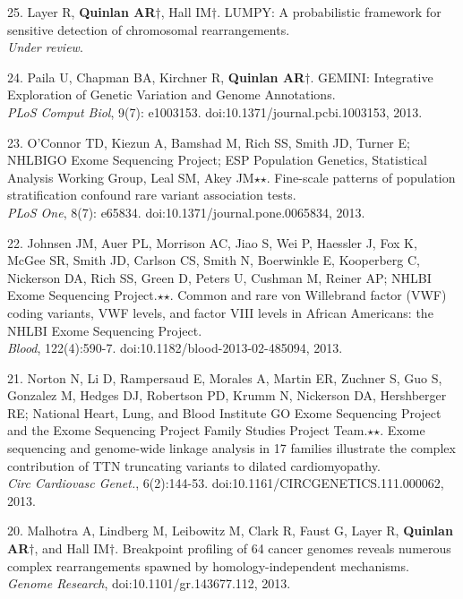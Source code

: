 \documentclass[margin,line]{cv}
\begin{document}
\begin{resume}
\begin{list}{*}{}
    \item[25.] Layer R, \textbf{Quinlan AR}$\dagger$, Hall IM$\dagger$.
    LUMPY: A probabilistic framework for sensitive detection of chromosomal rearrangements.\\
    \emph{Under review}.

    \item[24.] Paila U, Chapman BA, Kirchner R, \textbf{Quinlan AR}$\dagger$.
    GEMINI: Integrative Exploration of Genetic Variation and Genome Annotations.\\
    \emph{PLoS Comput Biol}, 9(7): e1003153. doi:10.1371/journal.pcbi.1003153, 2013.

    \item[23.] O'Connor TD, Kiezun A, Bamshad M, Rich SS, Smith JD, Turner E; NHLBIGO Exome Sequencing Project; ESP Population Genetics, Statistical Analysis Working Group, Leal SM, Akey JM$\star$$\star$. Fine-scale patterns of population stratification confound rare variant association tests.\\
    \emph{PLoS One}, 8(7): e65834. doi:10.1371/journal.pone.0065834, 2013.

    \item[22.] Johnsen JM, Auer PL, Morrison AC, Jiao S, Wei P, Haessler J, Fox K, McGee SR, Smith JD, Carlson CS, Smith N, Boerwinkle E, Kooperberg C, Nickerson DA, Rich SS, Green D, Peters U, Cushman M, Reiner AP; NHLBI Exome Sequencing Project.$\star$$\star$. Common and rare von Willebrand factor (VWF) coding variants, VWF levels, and factor VIII levels in African Americans: the NHLBI Exome Sequencing Project.\\
    \emph{Blood}, 122(4):590-7. doi:10.1182/blood-2013-02-485094, 2013.

    \item[21.] Norton N, Li D, Rampersaud E, Morales A, Martin ER, Zuchner S, Guo S, Gonzalez M, Hedges DJ, Robertson PD, Krumm N, Nickerson DA, Hershberger RE; National Heart, Lung, and Blood Institute GO Exome Sequencing Project and the Exome Sequencing Project Family Studies Project Team.$\star$$\star$. Exome sequencing and genome-wide linkage analysis in 17 families illustrate the complex contribution of TTN truncating variants to dilated cardiomyopathy.\\
    \emph{Circ Cardiovasc Genet.}, 6(2):144-53. doi:10.1161/CIRCGENETICS.111.000062, 2013.
	
    \item[20.] Malhotra A, Lindberg M, Leibowitz M, Clark R, Faust G, Layer R, \textbf{Quinlan AR}$\dagger$, and Hall IM$\dagger$.
    Breakpoint profiling of 64 cancer genomes reveals numerous complex rearrangements spawned by homology-independent mechanisms. \\
    \emph{Genome Research}, doi:10.1101/gr.143677.112, 2013.


\end{list}
\end{resume}
\end{document}
